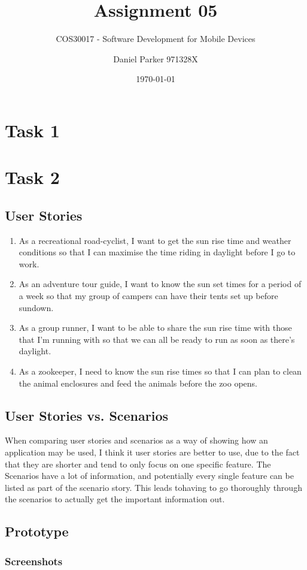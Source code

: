 \documentclass[11pt,english,numbers=endperiod,parskip=half]{scrartcl}
\title{Assignment 05}
\subtitle{COS30017 - Software Development for Mobile Devices}
\author{Daniel Parker 971328X}
\date{\today}
\begin{document}
\maketitle
\thispagestyle{empty}

\section{Task 1}

\section{Task 2}
\subsection{User Stories}
\begin{enumerate}
	\item{As a recreational road-cyclist, I want to get the sun rise time and
	weather conditions so that I can maximise the time riding in daylight before
	I go to work.}
	\item{As an adventure tour guide, I want to know the sun set times for a
	period of a week so that my group of campers can have their tents set up
	before sundown.}
	\item{As a group runner, I want to be able to share the sun rise time with
	those that I'm running with so that we can all be ready to run as soon as
	there's daylight.}
	\item{As a zookeeper, I need to know the sun rise times so that I can plan
	to clean the animal enclosures and feed the animals before the zoo opens.}
\end{enumerate}
\subsection{User Stories vs. Scenarios}
When comparing user stories and scenarios as a way of showing how an application
 may be used, I think it user stories are better to use, due to the fact that
they are shorter and tend to only focus on one specific feature. The Scenarios
have a lot of information, and potentially every single feature can be listed as
 part of the scenario story. This leads tohaving to go thoroughly through the
scenarios to actually get the important information out.
\subsection{Prototype}
\subsubsection{Screenshots}
\setlength\fboxsep{0pt}
\setlength\fboxrule{0.5pt}
\end{document}
